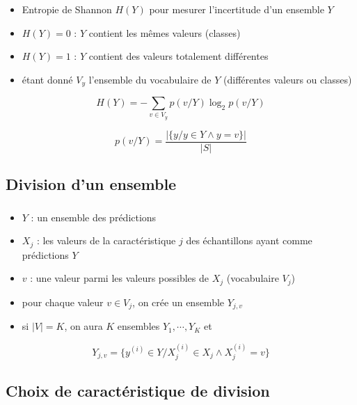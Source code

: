 \documentclass[xcolor=table]{beamer}
\begin{document}
\begin{frame}
	\frametitle{\insertsection}
	\framesubtitle{\insertsubsection}
	
	\begin{itemize}
		\item Entropie de Shannon $H(Y)$ pour mesurer l'incertitude d'un ensemble $Y$
		\item $H(Y)=0$ : $Y$ contient les mêmes valeurs (classes)
		\item $H(Y)=1$ : $Y$ contient des valeurs totalement différentes
		\item étant donné $V_y$ l'ensemble du vocabulaire de $Y$ (différentes valeurs ou classes)
	\end{itemize}

	\[H(Y) = - \sum\limits_{v \in V_y} p(v/Y) \log_2 p(v/Y)\]
	
	\[p(v/Y) = \frac{|\{y / y \in Y \wedge y = v\}|}{|S|}\]
	
\end{frame}

\subsection{Division d'un ensemble}

\begin{frame}
	\frametitle{\insertsection}
	\framesubtitle{\insertsubsection}
	
	\begin{itemize}
		\item $Y$ : un ensemble des prédictions 
		\item $X_j$ : les valeurs de la caractéristique $j$ des échantillons ayant comme prédictions $Y$
		\item $v$ : une valeur parmi les valeurs possibles de $X_j$ (vocabulaire $V_j$)
		\item pour chaque valeur $v \in V_j$, on crée un ensemble $Y_{j, v}$
		\item si $|V| = K$, on aura $K$ ensembles $Y_1, \cdots, Y_K$ et 
	\end{itemize}
	
	\[Y_{j,v} = \{y^{(i)} \in Y / X_j^{(i)} \in X_j \wedge X_j^{(i)} = v\}\]

	
\end{frame}

\subsection{Choix de caractéristique de division}
\end{document}
